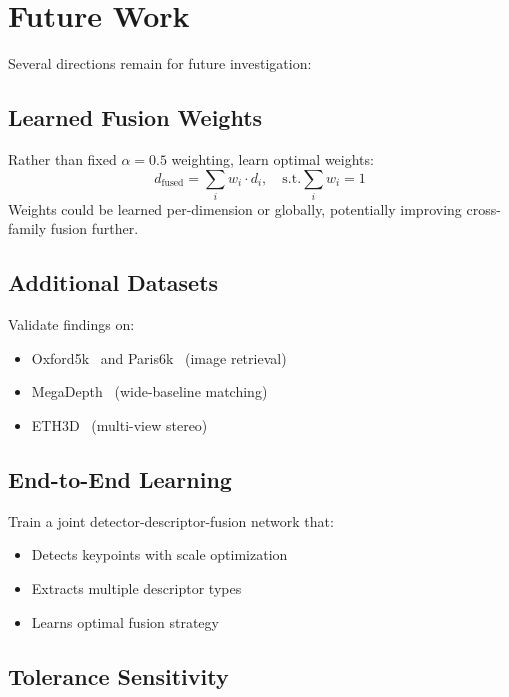 \section{Future Work}

Several directions remain for future investigation:

\subsection{Learned Fusion Weights}

Rather than fixed $\alpha = 0.5$ weighting, learn optimal weights:
\begin{equation}
    d_{\text{fused}} = \sum_i w_i \cdot d_i, \quad \text{s.t.} \sum_i w_i = 1
\end{equation}
Weights could be learned per-dimension or globally, potentially improving cross-family fusion further.

\subsection{Additional Datasets}

Validate findings on:
\begin{itemize}
    \item Oxford5k~\cite{oxford-dataset} and Paris6k~\cite{philbin2008lost} (image retrieval)
    \item MegaDepth~\cite{li2018megadepth} (wide-baseline matching)
    \item ETH3D~\cite{schops2017eth3d} (multi-view stereo)
\end{itemize}

\subsection{End-to-End Learning}

Train a joint detector-descriptor-fusion network that:
\begin{itemize}
    \item Detects keypoints with scale optimization
    \item Extracts multiple descriptor types
    \item Learns optimal fusion strategy
\end{itemize}

\subsection{Tolerance Sensitivity}

